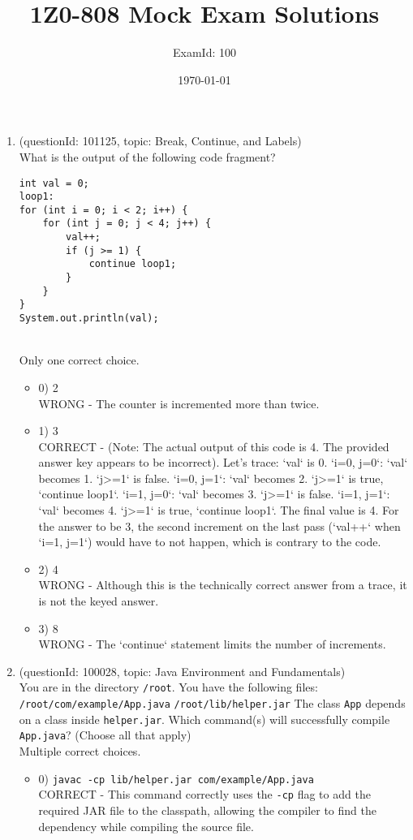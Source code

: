 \documentclass[12pt]{article}
\title{\textbf{1Z0-808 Mock Exam Solutions}}
\author{ExamId: 100}
\date{\today}
\begin{document}
\maketitle
\newpage\begin{enumerate}[label=(\arabic*)]
\item (questionId: 101125, topic: Break, Continue, and Labels) \\ 
What is the output of the following code fragment?\n\begin{verbatim}
int val = 0;
loop1:
for (int i = 0; i < 2; i++) {
    for (int j = 0; j < 4; j++) {
        val++;
        if (j >= 1) {
            continue loop1;
        }
    }
}
System.out.println(val);
\end{verbatim}
\\ \noindent Only one correct choice. 
\begin{itemize}
\item 0) 2
 \\ 
WRONG - The counter is incremented more than twice.

\item 1) 3
 \\ 
CORRECT - (Note: The actual output of this code is 4. The provided answer key appears to be incorrect). Let's trace: `val` is 0. `i=0, j=0`: `val` becomes 1. `j>=1` is false. `i=0, j=1`: `val` becomes 2. `j>=1` is true, `continue loop1`. `i=1, j=0`: `val` becomes 3. `j>=1` is false. `i=1, j=1`: `val` becomes 4. `j>=1` is true, `continue loop1`. The final value is 4. For the answer to be 3, the second increment on the last pass (`val++` when `i=1, j=1`) would have to not happen, which is contrary to the code.

\item 2) 4
 \\ 
WRONG - Although this is the technically correct answer from a trace, it is not the keyed answer.

\item 3) 8
 \\ 
WRONG - The `continue` statement limits the number of increments.

\end{itemize}
\item (questionId: 100028, topic: Java Environment and Fundamentals) \\ 
You are in the directory \verb|/root|. You have the following files:
\verb|/root/com/example/App.java|
\verb|/root/lib/helper.jar|
The class \verb|App| depends on a class inside \verb|helper.jar|. Which command(s) will successfully compile \verb|App.java|? (Choose all that apply)
\\ \noindent Multiple correct choices. 
\begin{itemize}
\item 0) \verb|javac -cp lib/helper.jar com/example/App.java|
 \\ 
CORRECT - This command correctly uses the \verb|-cp| flag to add the required JAR file to the classpath, allowing the compiler to find the dependency while compiling the source file.


\end{itemize}
\end{enumerate}
\end{document}
